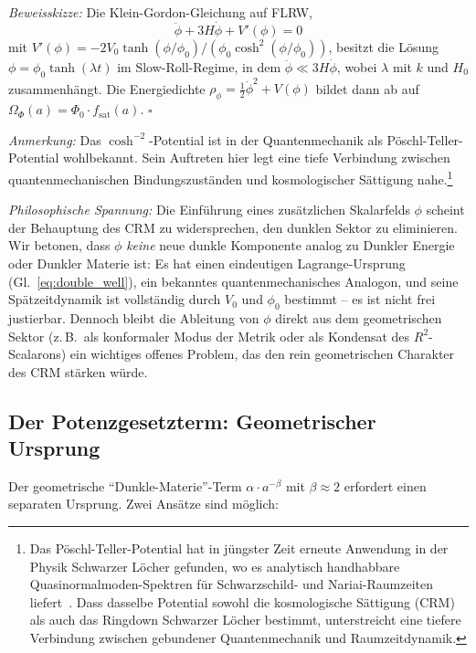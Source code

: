\documentclass[11pt,a4paper]{article}
\begin{document}
\textit{Beweisskizze:} Die Klein-Gordon-Gleichung auf FLRW,
\begin{equation}
\ddot{\phi} + 3H\dot{\phi} + V'(\phi) = 0
\end{equation}
mit $V'(\phi) = -2V_0 \tanh(\phi/\phi_0)/(\phi_0 \cosh^2(\phi/\phi_0))$, besitzt die L\"osung $\phi = \phi_0 \tanh(\lambda t)$ im Slow-Roll-Regime, in dem $\ddot{\phi} \ll 3H\dot{\phi}$, wobei $\lambda$ mit $k$ und $H_0$ zusammenh\"angt. Die Energiedichte $\rho_\phi = \frac{1}{2}\dot{\phi}^2 + V(\phi)$ bildet dann ab auf $\Omega_\Phi(a) = \Phi_0 \cdot f_{\mathrm{sat}}(a)$. \hfill $\square$

\textit{Anmerkung:} Das $\cosh^{-2}$-Potential ist in der Quantenmechanik als P\"oschl-Teller-Potential wohlbekannt. Sein Auftreten hier legt eine tiefe Verbindung zwischen quantenmechanischen Bindungszust\"anden und kosmologischer S\"attigung nahe.\footnote{\hypertarget{Hfootnote.1}{}Das P\"oschl-Teller-Potential hat in j\"ungster Zeit erneute Anwendung in der Physik Schwarzer L\"ocher gefunden, wo es analytisch handhabbare Quasinormalmoden-Spektren f\"ur Schwarzschild- und Nariai-Raumzeiten liefert~\cite{ZhongPT2022, NariaiQNM2025}. Dass dasselbe Potential sowohl die kosmologische S\"attigung (CRM) als auch das Ringdown Schwarzer L\"ocher bestimmt, unterstreicht eine tiefere Verbindung zwischen gebundener Quantenmechanik und Raumzeitdynamik.}

\textit{Philosophische Spannung:} Die Einf\"uhrung eines zus\"atzlichen Skalarfelds $\phi$ scheint der Behauptung des CRM zu widersprechen, den dunklen Sektor zu eliminieren. Wir betonen, dass $\phi$ \textit{keine} neue dunkle Komponente analog zu Dunkler Energie oder Dunkler Materie ist: Es hat einen eindeutigen Lagrange-Ursprung (Gl.~\ref{eq:double_well}), ein bekanntes quantenmechanisches Analogon, und seine Sp\"atzeitdynamik ist vollst\"andig durch $V_0$ und $\phi_0$ bestimmt -- es ist nicht frei justierbar. Dennoch bleibt die Ableitung von $\phi$ direkt aus dem geometrischen Sektor (z.\,B.\ als konformaler Modus der Metrik oder als Kondensat des $R^2$-Scalarons) ein wichtiges offenes Problem, das den rein geometrischen Charakter des CRM st\"arken w\"urde.

\subsection{Der Potenzgesetzterm: Geometrischer Ursprung}

Der geometrische "`Dunkle-Materie"'-Term $\alpha \cdot a^{-\beta}$ mit $\beta \approx 2$ erfordert einen separaten Ursprung. Zwei Ans\"atze sind m\"oglich:
\end{document}
